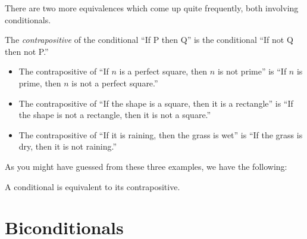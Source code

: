 \documentclass{tufte-book}
\begin{document}
There are two more equivalences which come up quite frequently, both involving conditionals.

\begin{definition}
  The \emph{contrapositive} of the conditional ``If P then Q'' is the conditional ``If not Q then not P.''
\end{definition}

\begin{example}
  \begin{itemize}
      \item The contrapositive of ``If $n$ is a perfect square, then $n$ is not prime'' is ``If $n$ is prime, then $n$ is not a perfect square.''
      \item The contrapositive of ``If the shape is a square, then it is a rectangle'' is ``If the shape is not a rectangle, then it is not a square.''
      \item The contrapositive of ``If it is raining, then the grass is wet'' is ``If the grass is dry, then it is not raining.''
  \end{itemize}
\end{example}

As you might have guessed from these three examples, we have the following:
\begin{theorem}
  A conditional is equivalent to its contrapositive.
\end{theorem}

\section{Biconditionals}
\label{sec:biconditionals}





\end{document}
